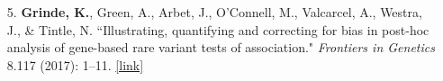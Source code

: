 \documentclass[margin]{res}
\begin{document}
\begin{resume}
\begin{itemize}
\item[5.] \textbf{Grinde, K.}, Green, A., Arbet, J., O'Connell, M., Valcarcel, A., Westra, J., \& Tintle, N. ``Illustrating, quantifying and correcting for bias in post-hoc analysis of gene-based rare variant tests of association." \textit{Frontiers in Genetics} 8.117 (2017): 1--11. 
\href{https://www.frontiersin.org/articles/10.3389/fgene.2017.00117/full}{[link]}
	

\end{itemize}
\end{resume}
\end{document}
